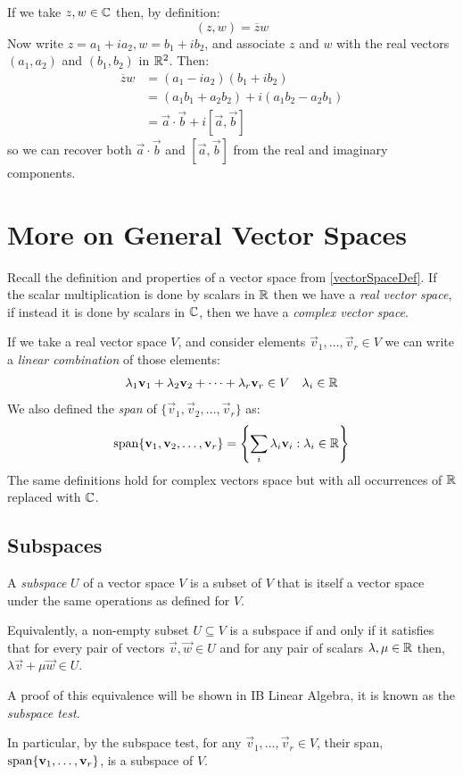 \documentclass[../main.tex]{subfiles}
\begin{document}
If we take $z, w \in \mathbb{C}$ then, by definition:
\[
  (z, w) = \overline{z}w
\]
Now write $z = a_1 + ia_2, w = b_1 + ib_2$, and associate $z$ and $w$ with the real vectors $(a_1, a_2)$ and $(b_1, b_2)$ in $\mathbb{R}^2$.
Then:
\begin{align*}
  \overline{z}w &= (a_1 - i a_2)(b_1 + i b_2) \\
         &= (a_1 b_1 + a_2 b_2) + i(a_1 b_2 - a_2 b_1) \\
         &= \vec{a} \cdot \vec{b} + i[\vec{a}, \vec{b}]
\end{align*}
so we can recover both $\vec{a} \cdot \vec{b}$ and $[\vec{a}, \vec{b}]$ from the real and imaginary components.
\section{More on General Vector Spaces}
\begin{remark}[Recap]\par
Recall the definition and properties of a vector space from \cref{vectorSpaceDef}.
If the scalar multiplication is done by scalars in $\mathbb{R}$ then we have a \textit{real vector space}, if instead it is done by scalars in $\mathbb{C}$, then we have a \textit{complex vector space}.

If we take a real vector space $V$, and consider elements $\vec{v}_1, \ldots, \vec{v}_r \in V$ we can write a \textit{linear combination} of those elements:
\[
  \lambda_1 \mathbf{\bm{v}}_1 + \lambda_2 \mathbf{\bm{v}}_2 + \cdots + \lambda_r \mathbf{\bm{v}}_r \in V \quad \lambda_i \in \mathbb{R}
\]
We also defined the \textit{span} of $\{\vec{v}_1, \vec{v}_2, \ldots, \vec{v}_r\}$ as:
\[
  \operatorname{span}\{\mathbf{\bm{v}}_1, \mathbf{\bm{v}}_2, \ldots, \mathbf{\bm{v}}_r\} = \left\{\sum_{i}^{} \lambda_i \mathbf{\bm{v}}_i : \lambda_i \in \mathbb{R}\right\}
\]
The same definitions hold for complex vectors space but with all occurrences of $\mathbb{R}$ replaced with $\mathbb{C}$.
\end{remark}
\subsection{Subspaces}
\begin{definition}[Subspace]
  A \textit{subspace} $U$ of a vector space $V$ is a subset of $V$ that is itself a vector space under the same operations as defined for $V$.

  Equivalently, a non-empty subset $U \subseteq V$ is a subspace if and only if it satisfies that for every pair of vectors $\vec{v}, \vec{w} \in U$ and for any pair of scalars $\lambda, \mu \in \mathbb{R}$ then, $\lambda \vec{v} + \mu \vec{w} \in U$.
\end{definition}
\begin{remark}
  A proof of this equivalence will be shown in IB Linear Algebra, it is known as the \textit{subspace test}.
\end{remark}
In particular, by the subspace test, for any $\vec{v}_1, \ldots, \vec{v}_r \in V$, their span, $\operatorname{span}\{\mathbf{\bm{v}}_1, \ldots, \mathbf{\bm{v}}_r\}$, is a subspace of $V$.
\end{document}

